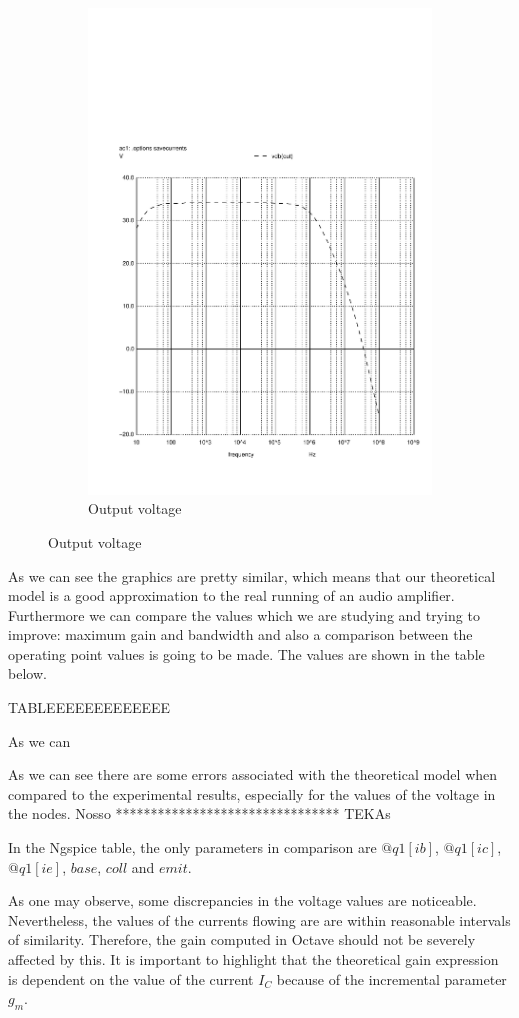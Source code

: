 \begin{figure}[ht]
\begin{subfigure}{.5\textwidth}
  \includegraphics[width=.75\linewidth]{vo2f.pdf}
  \caption{Output voltage}
  \label{fig:sim5}
\end{subfigure}
\end{figure}

\par As we can see the graphics are pretty similar, which means that our theoretical model is a good approximation to the real running of an audio amplifier. Furthermore we can compare the values which we are studying and trying to improve: maximum gain and bandwidth and also a comparison between the operating point values is going to be made. The values are shown in the table below.

TABLEEEEEEEEEEEEE

\par As we can  

\par As we can see there are some errors associated with the theoretical model when compared to the experimental results, especially for the values of the voltage in the nodes.
Nosso
********************************
TEKAs



In the Ngspice table, the only parameters in comparison are $@q1[ib]$, $@q1[ic]$, $@q1[ie]$, $base$, $coll$ and $emit$.
\par As one may observe, some discrepancies in the voltage values are noticeable. Nevertheless, the values of the currents flowing are are within reasonable intervals of similarity. Therefore, the gain computed in Octave should not be severely affected by this. It is important to highlight that the theoretical gain expression is dependent on the value of the current $I_{C}$ because of the incremental parameter $g_{m}$. 

